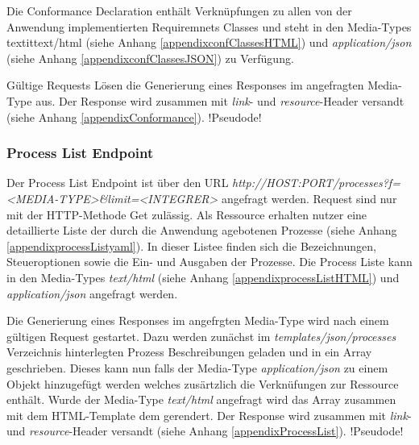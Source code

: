 Die Conformance Declaration enthält Verknüpfungen zu allen von der Anwendung implementierten Requiremnets Classes und steht in den Media-Types textit{text/html} (siehe Anhang \ref{appendixconfClassesHTML}) und 
\textit{application/json} (siehe Anhang \ref{appendixconfClassesJSON}) zu Verfügung.

Gültige Requests Lösen die Generierung eines Responses im angefragten Media-Type aus. Der Response wird zusammen mit \textit{link}- und \textit{resource}-Header versandt (siehe Anhang \ref{appendixConformance}).
!Pseudode!

\subsubsection{Process List Endpoint}
Der Process List Endpoint ist über den URL \textit{http://HOST:PORT/processes?f=<MEDIA-TYPE>&limit=<INTEGRER>} angefragt werden. 
Request sind nur mit der HTTP-Methode Get zulässig. Als Ressource erhalten nutzer eine detaillierte Liste der durch die Anwendung agebotenen Prozesse (siehe Anhang \ref{appendixprocessListyaml}). In dieser Listee finden sich die Bezeichnungen, 
Steueroptionen sowie die 
Ein- und Ausgaben der Prozesse. Die Process Liste kann in den Media-Types \textit{text/html} (siehe Anhang \ref{appendixprocessListHTML}) und \textit{application/json} angefragt werden. 

Die Generierung eines Responses im angefrgten Media-Type wird nach einem gültigen Request gestartet. Dazu werden zunächst im \textit{templates/json/processes} Verzeichnis hinterlegten Prozess Beschreibungen geladen und in ein Array geschrieben. 
Dieses kann nun falls der Media-Type \textit{application/json} zu einem Objekt hinzugefügt werden welches zusärtzlich die Verknüfungen zur Ressource enthält. Wurde der Media-Type \textit{text/html} angefragt wird das Array zusammen mit dem HTML-Template dem 
gerendert. 
Der Response wird zusammen mit \textit{link}- und \textit{resource}-Header versandt (siehe Anhang \ref{appendixProcessList}).
!Pseudode!

